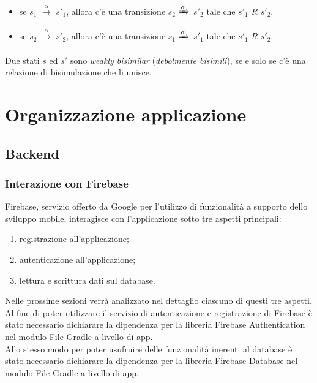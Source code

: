 \documentclass[a4paper,11pt,twoside,openright]{report}
\begin{document}
\begin{itemize}
\item se $s_1$ $\xrightarrow{\alpha}$ $s'_1$, allora c'è una transizione $s_2$ $\xRightarrow{\alpha}$ $s'_2$ tale che $s'_1$ $R$ $s'_2$.

\item se $s_2$ $\xrightarrow{\alpha}$ $s'_2$, allora c'è una transizione $s_1$ $\xRightarrow{\alpha}$ $s'_1$ tale che $s'_1$ $R$ $s'_2$.
\end{itemize}

Due stati $s$ ed $s'$ sono \textit{weakly bisimilar} (\textit{debolmente bisimili}), se e solo se c'è una relazione di bisimulazione che li unisce.

\chapter{Organizzazione applicazione}
\section{Backend}
\subsection{Interazione con Firebase}
Firebase, servizio offerto da Google per l'utilizzo di funzionalità a supporto dello sviluppo mobile, interagisce con l'applicazione sotto tre aspetti principali:

\begin{enumerate}
\item registrazione all'applicazione;

\item autenticazione all'applicazione;

\item lettura e scrittura dati sul database.
\end{enumerate}

Nelle prossime sezioni verrà analizzato nel dettaglio ciascuno di questi tre aspetti.\\
Al fine di poter utilizzare il servizio di autenticazione e registrazione di Firebase è stato necessario dichiarare la dipendenza per la libreria Firebase Authentication nel modulo File Gradle a livello di app.\\
Allo stesso modo per poter usufruire delle funzionalità inerenti al database è stato necessario dichiarare la dipendenza per la libreria Firebase Database nel modulo File Gradle a livello di app.
\end{document}
